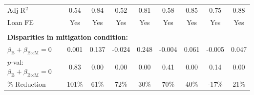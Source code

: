 {\begin{tabular}{l*{8}{c}}
Adj R$^2$                                    &     0.54         &     0.84         &     0.52         &     0.81         &     0.58         &     0.85         &     0.75         &     0.88         \\
Loan FE                                      &      Yes         &      Yes         &      Yes         &      Yes         &      Yes         &      Yes         &      Yes         &      Yes         \\
\\ \multicolumn{6}{l}{\textbf{Disparities in mitigation condition:}} \\ $\beta_{\text{B}} + \beta_{\text{B}\times\text{M}} = 0 $&    0.001         &    0.137         &   -0.024         &    0.248         &   -0.004         &    0.061         &   -0.005         &    0.047         \\
$p$-val: $\beta_{\text{B}} + \beta_{\text{B}\times\text{M}} = 0 $&     0.83         &     0.00         &     0.00         &     0.00         &     0.41         &     0.00         &     0.14         &     0.00         \\
\% Reduction                                  &     101\%         &      61\%         &      72\%         &      30\%         &      70\%         &      40\%         &     -17\%         &      21\%         \\
\bottomrule
\end{tabular}
}
